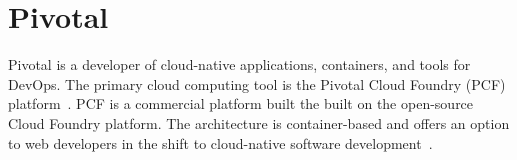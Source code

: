 \section{Pivotal}

Pivotal is a developer of cloud-native applications, containers, and
tools for DevOps. The primary cloud computing tool is the Pivotal
Cloud Foundry (PCF) platform~\cite{hid-sp18-404-Pivotal2017}. PCF is a
commercial platform built the built on the open-source Cloud Foundry
platform. The architecture is container-based and offers an option to
web developers in the shift to cloud-native software
development~\cite{hid-sp18-404-Darrow2016}.
